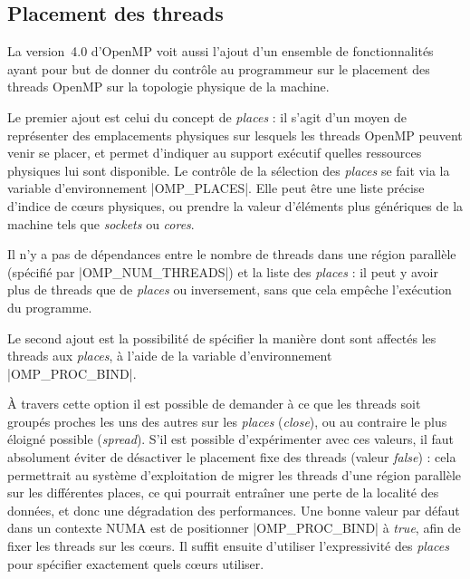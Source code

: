 \subsection{Placement des threads}

La version~4.0 d'OpenMP voit aussi l'ajout d'un ensemble de fonctionnalités ayant pour but de donner du contrôle au programmeur sur le placement des threads OpenMP sur la topologie physique de la machine.

Le premier ajout est celui du concept de \emph{places} : il s'agit d'un moyen de représenter des emplacements physiques sur lesquels les threads OpenMP peuvent venir se placer, et permet d'indiquer au support exécutif quelles ressources physiques lui sont disponible.
Le contrôle de la sélection des \emph{places} se fait via la variable d'environnement |OMP_PLACES|.
Elle peut être une liste précise d'indice de cœurs physiques, ou prendre la valeur d'éléments plus génériques de la machine tels que \emph{sockets} ou \emph{cores}.

Il n'y a pas de dépendances entre le nombre de threads dans une région parallèle (spécifié par |OMP_NUM_THREADS|) et la liste des \emph{places} : il peut y avoir plus de threads que de \emph{places} ou inversement, sans que cela empêche l'exécution du programme.

Le second ajout est la possibilité de spécifier la manière dont sont affectés les threads aux \emph{places}, à l'aide de la variable d'environnement |OMP_PROC_BIND|.

À travers cette option il est possible de demander à ce que les threads soit groupés proches les uns des autres sur les \emph{places} (\emph{close}), ou au contraire le plus éloigné possible (\emph{spread}).
S'il est possible d'expérimenter avec ces valeurs, il faut absolument éviter de désactiver le placement fixe des threads (valeur \emph{false}) : cela permettrait au système d'exploitation de migrer les threads d'une région parallèle sur les différentes places, ce qui pourrait entraîner une perte de la localité des données, et donc une dégradation des performances.
Une bonne valeur par défaut dans un contexte NUMA est de positionner |OMP_PROC_BIND| à \emph{true}, afin de fixer les threads sur les cœurs.
Il suffit ensuite d'utiliser l'expressivité des \emph{places} pour spécifier exactement quels cœurs utiliser.

